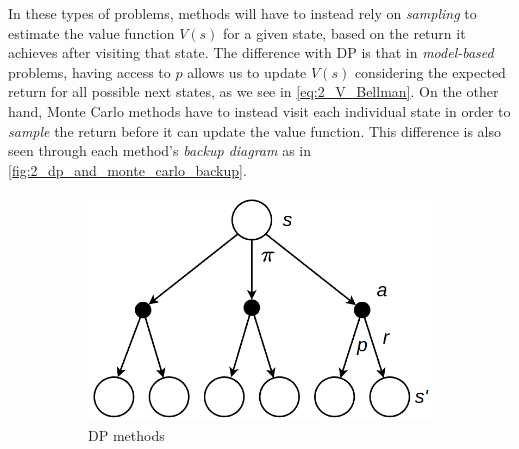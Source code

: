 In these types of problems, methods will have to instead rely on \textit{sampling} to estimate the value function $V(s)$ for a given state, based on the return it achieves after visiting that state. The difference with DP is that in \textit{model-based} problems, having access to $p$ allows us to update $V(s)$ considering the expected return for all possible next states, as we see in \eqref{eq:2_V_Bellman}. On the other hand, Monte Carlo methods have to instead visit each individual state in order to \textit{sample} the return before it can update the value function. This difference is also seen through each method's \textit{backup diagram} as in \cref{fig:2_dp_and_monte_carlo_backup}.
\begin{figure}[hbt]
    \begin{subfigure}[b]{0.7\textwidth}
        \centering
        \includegraphics[scale=0.3]{figures/2_RL/2_dp_backup.png}
        \caption{DP methods}
        \label{fig:2_dp_backup}
    \end{subfigure}
    \hfill
    \begin{subfigure}[b]{0.29\textwidth}
        \centering

\end{subfigure}
\end{figure}
